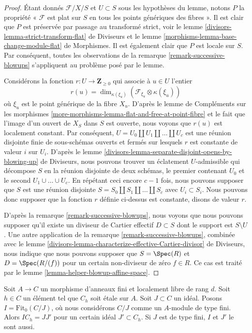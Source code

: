 \begin{proof}
Étant donnés $\mathcal{F}/X/S$ et $U \subset S$ sous les hypothèses du
lemme, notons $P$ la propriété « $\mathcal{F}$ est plat sur $S$ en
tous les points génériques des fibres ». Il est clair que $P$ est préservée par passage au
transformé strict, voir le
lemme \ref{divisors-lemma-strict-transform-flat} de Diviseurs
et le lemme \ref{morphisms-lemma-base-change-module-flat} de Morphismes.
Il est également clair que $P$ est locale sur $S$. Par conséquent, toutes les observations
de la remarque \ref{remark-successive-blowups} s'appliquent au problème posé par
le lemme.

\medskip\noindent
Considérons la fonction $r : U \to \mathbf{Z}_{\geq 0}$ qui associe à
$u \in U$ l'entier
$$
r(u) = \dim_{\kappa(\xi_u)}(\mathcal{F}_{\xi_u} \otimes \kappa(\xi_u))
$$
où $\xi_u$ est le point générique de la fibre $X_u$.
D'après le lemme de Compléments sur les morphismes
\ref{more-morphisms-lemma-flat-and-free-at-point-fibre}
et le fait que l'image d'un ouvert de $X_S$ dans $S$ est ouverte,
nous voyons que $r(u)$ est localement constant. Par conséquent,
$U = U_0 \amalg U_1 \amalg \ldots \amalg U_c$ est une réunion disjointe finie
de sous-schémas ouverts et fermés sur lesquels $r$ est constante de valeur
$i$ sur $U_i$. D'après le
lemme \ref{divisors-lemma-separate-disjoint-opens-by-blowing-up} de Diviseurs,
nous pouvons trouver un éclatement $U$-admissible qui décompose $S$ en
la réunion disjointe de deux schémas, le premier contenant $U_0$ et
le second $U_1 \cup \ldots \cup U_c$. En répétant ceci encore $c - 1$
fois, nous pouvons supposer que $S$ est une réunion disjointe
$S = S_0 \amalg S_1 \amalg \ldots \amalg S_c$ avec $U_i \subset S_i$.
Nous pouvons donc supposer que la fonction $r$ définie ci-dessus est constante, disons
de valeur $r$.

\medskip\noindent
D'après la remarque \ref{remark-successive-blowups}, nous voyons que nous pouvons supposer qu'il
existe un diviseur de Cartier effectif $D \subset S$ dont le support est
$S \setminus U$. Une autre application de la remarque \ref{remark-successive-blowups},
combinée avec le
lemme \ref{divisors-lemma-characterize-effective-Cartier-divisor} de Diviseurs,
nous indique que nous pouvons supposer que
$S = \Spec(R)$ et $D = \Spec(R/(f))$ pour un certain non-diviseur de zéro
$f \in R$. Ce cas est traité par le
lemme \ref{lemma-helper-blowup-affine-space}.
\end{proof}

\begin{lemma}
\label{lemma-trick-fitting-ideal}
Soit $A \to C$ un morphisme d'anneaux fini et localement libre de rang $d$.
Soit $h \in C$ un élément tel que $C_h$ soit \'etale sur $A$.
Soit $J \subset C$ un idéal. Posons $I = \text{Fit}_0(C/J)$, où nous
considérons $C/J$ comme un $A$-module de type fini. Alors $IC_h = JJ'$ pour un certain idéal
$J' \subset C_h$. Si $J$ est de type fini, $I$ et $J'$ le sont aussi.
\end{lemma}

